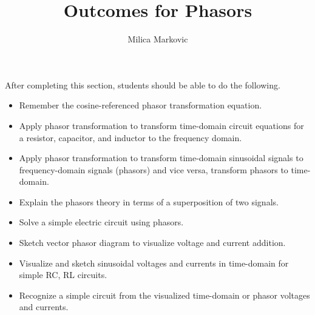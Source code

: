 \documentclass{ximera}
\title{Outcomes for Phasors}
\author{Milica Markovic}
\begin{document}
\begin{abstract}
\end{abstract}

\maketitle

\begin{sectionOutcomes}

After completing this section, students should be able to do the following.

\begin{itemize}
\item Remember the cosine-referenced phasor transformation equation.
\item Apply phasor transformation to transform time-domain circuit equations for a resistor, capacitor, and inductor to the frequency domain.
\item Apply phasor transformation to transform time-domain sinusoidal signals to frequency-domain signals (phasors) and vice versa, transform phasors to time-domain.
\item Explain the phasors theory in terms of a superposition of two signals.
\item Solve a simple electric circuit using phasors.
\item Sketch vector phasor diagram to visualize voltage and current addition.
\item Visualize and sketch sinusoidal voltages and currents in time-domain for simple RC, RL circuits.
\item Recognize a simple circuit from the visualized time-domain or phasor voltages and currents.
\end{itemize}

\end{sectionOutcomes}
\end{document}
